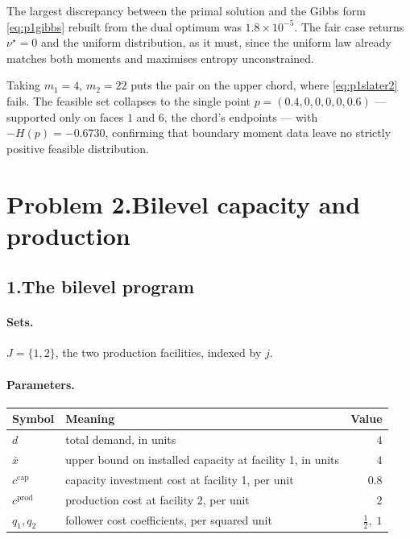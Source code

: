 \documentclass[11pt]{article}
\theoremstyle{definition}
\begin{document}
The largest discrepancy between the primal solution and the Gibbs form
\eqref{eq:p1gibbs} rebuilt from the dual optimum was
$1.8 \times 10^{-5}$. The fair case returns $\nu^\star = 0$ and the
uniform distribution, as it must, since the uniform law already matches
both moments and maximises entropy unconstrained.

Taking $m_1 = 4$, $m_2 = 22$ puts the pair on the upper chord, where
\eqref{eq:p1slater2} fails. The feasible set collapses to the single
point $p = (0.4,0,0,0,0,0.6)$ --- supported only on faces $1$ and $6$,
the chord's endpoints --- with $-H(p) = -0.6730$, confirming that
boundary moment data leave no strictly positive feasible distribution.

\section*{Problem 2.\quad Bilevel capacity and production \quad[15 pts]}

\subsection*{1.\quad The bilevel program}

\paragraph{Sets.} $J = \{1,2\}$, the two production facilities, indexed
by $j$.

\paragraph{Parameters.}
\begin{center}
\begin{tabular}{@{}llr@{}}
\toprule
Symbol & Meaning & Value\\
\midrule
$d$ & total demand, in units & $4$\\
$\bar{x}$ & upper bound on installed capacity at facility 1, in units & $4$\\
$c^{\mathrm{cap}}$ & capacity investment cost at facility 1, per unit & $0.8$\\
$c^{\mathrm{prod}}$ & production cost at facility 2, per unit & $2$\\
$q_1, q_2$ & follower cost coefficients, per squared unit
  & $\tfrac12,\; 1$\\
\bottomrule
\end{tabular}
\end{center}
\end{document}
